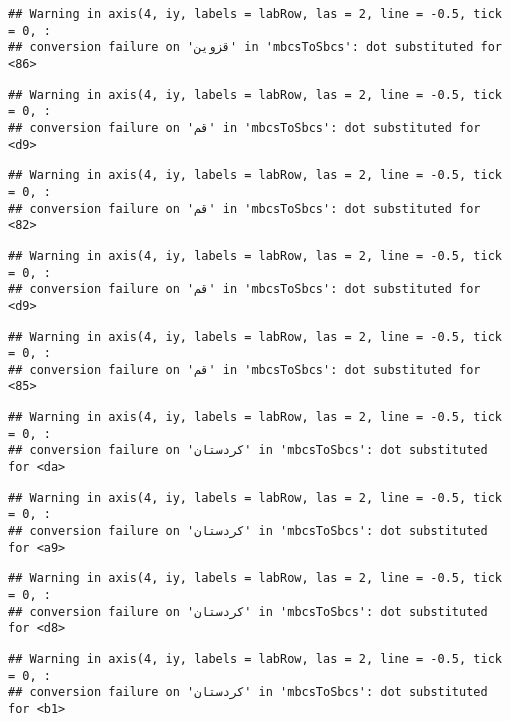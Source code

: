 \documentclass[
]{article}
\begin{document}
\begin{verbatim}
## Warning in axis(4, iy, labels = labRow, las = 2, line = -0.5, tick = 0, :
## conversion failure on 'قزوین' in 'mbcsToSbcs': dot substituted for <86>
\end{verbatim}

\begin{verbatim}
## Warning in axis(4, iy, labels = labRow, las = 2, line = -0.5, tick = 0, :
## conversion failure on 'قم' in 'mbcsToSbcs': dot substituted for <d9>
\end{verbatim}

\begin{verbatim}
## Warning in axis(4, iy, labels = labRow, las = 2, line = -0.5, tick = 0, :
## conversion failure on 'قم' in 'mbcsToSbcs': dot substituted for <82>
\end{verbatim}

\begin{verbatim}
## Warning in axis(4, iy, labels = labRow, las = 2, line = -0.5, tick = 0, :
## conversion failure on 'قم' in 'mbcsToSbcs': dot substituted for <d9>
\end{verbatim}

\begin{verbatim}
## Warning in axis(4, iy, labels = labRow, las = 2, line = -0.5, tick = 0, :
## conversion failure on 'قم' in 'mbcsToSbcs': dot substituted for <85>
\end{verbatim}

\begin{verbatim}
## Warning in axis(4, iy, labels = labRow, las = 2, line = -0.5, tick = 0, :
## conversion failure on 'کردستان' in 'mbcsToSbcs': dot substituted for <da>
\end{verbatim}

\begin{verbatim}
## Warning in axis(4, iy, labels = labRow, las = 2, line = -0.5, tick = 0, :
## conversion failure on 'کردستان' in 'mbcsToSbcs': dot substituted for <a9>
\end{verbatim}

\begin{verbatim}
## Warning in axis(4, iy, labels = labRow, las = 2, line = -0.5, tick = 0, :
## conversion failure on 'کردستان' in 'mbcsToSbcs': dot substituted for <d8>
\end{verbatim}

\begin{verbatim}
## Warning in axis(4, iy, labels = labRow, las = 2, line = -0.5, tick = 0, :
## conversion failure on 'کردستان' in 'mbcsToSbcs': dot substituted for <b1>
\end{verbatim}
\end{document}
